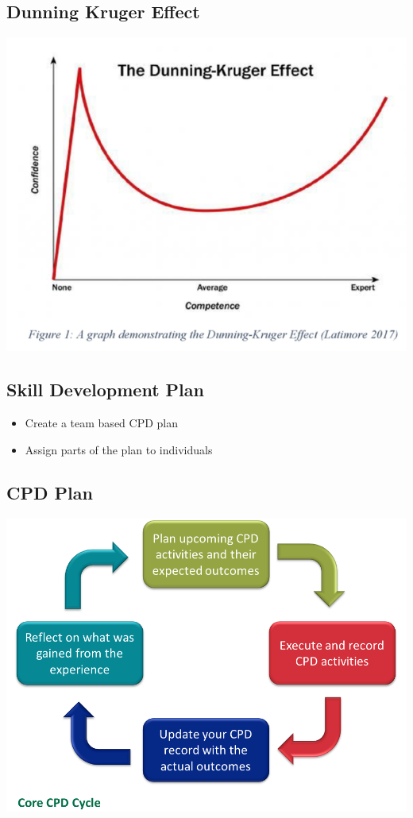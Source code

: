 \documentclass{article}[18pt]
\begin{document}
\subsection{Dunning Kruger Effect}
\begin{center}
	\includegraphics[scale=0.7]{Dunning_Kruger}
\end{center}
\subsection{Skill Development Plan}
\begin{itemize}
	\item Create a team based CPD plan
	\item Assign parts of the plan to individuals
\end{itemize}
\subsection{CPD Plan}
\begin{center}
	\includegraphics[scale=0.7]{Plan}
\end{center}
\end{document}
